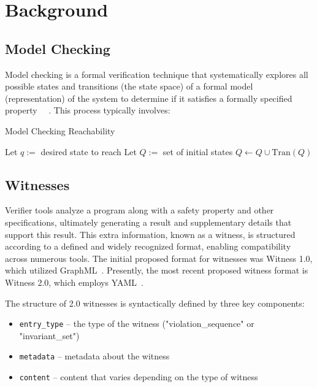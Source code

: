 \chapter{Background}

\section{Model Checking}
Model checking is a formal verification technique that 
systematically explores all possible states and transitions (the state space) of a formal model 
(representation) of the system to determine if it satisfies a formally specified property~\cite{HandbookMC}~\cite{Akos} .
This process typically involves:

\begin{algorithm}
\caption{Model Checking Reachability}
\begin{algorithmic}
\State Let $q :=$ desired state to reach
\State Let $Q :=$ set of initial states
  \State $Q \gets Q \cup \text{Tran}(Q)$
\EndWhile
\end{algorithmic}
\end{algorithm}




\section{Witnesses}
\label{sec:witnesses}
Verifier tools analyze a program along with a safety property and other specifications, ultimately
generating a result and supplementary details that support this result. This extra information, 
known as a witness, is structured according to a defined and widely recognized format, enabling 
compatibility across numerous tools. The initial proposed format for witnesses was Witness 1.0, which 
utilized GraphML~\cite{witness1}. Presently, the most recent proposed witness format is Witness 2.0, 
which employs YAML~\cite{witness2}.

The structure of 2.0 witnesses is syntactically defined by three key components:
\begin{itemize}
  \item \texttt{entry\_type} – the type of the witness ("violation\_sequence" or "invariant\_set")
  \item \texttt{metadata} – metadata about the witness
  \item \texttt{content} – content that varies depending on the type of witness
\end{itemize}

